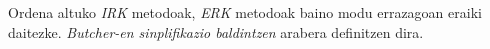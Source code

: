 Ordena altuko \emph{IRK} metodoak, \emph{ERK} metodoak baino modu errazagoan eraiki daitezke. \emph{Butcher-en sinplifikazio baldintzen}  \cite{Butcher2008} arabera definitzen dira.



